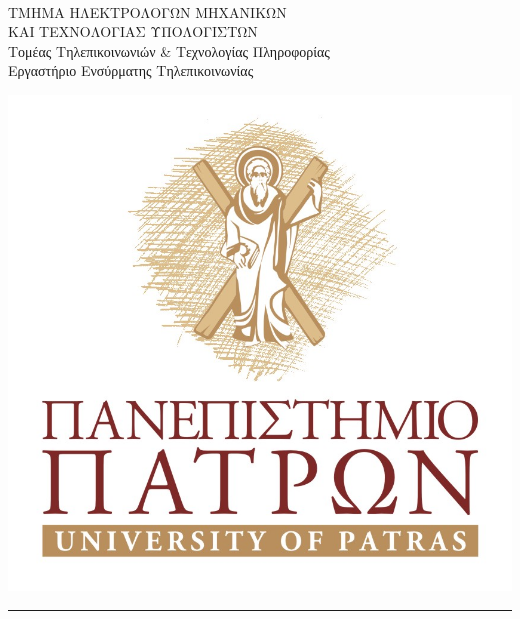 
\pagestyle{empty}



\begin{minipage}[c]{0.69\textwidth}
 \\
ΤΜΗΜΑ ΗΛΕΚΤΡΟΛΟΓΩΝ ΜΗΧΑΝΙΚΩΝ \\
ΚΑΙ ΤΕΧΝΟΛΟΓΙΑΣ ΥΠΟΛΟΓΙΣΤΩΝ \\
Τομέας Τηλεπικοινωνιών \& Τεχνολογίας Πληροφορίας\\
Εργαστήριο Ενσύρματης Τηλεπικοινωνίας
\end{minipage}
\begin{minipage}[c]{0.26\textwidth}
\includegraphics[scale=0.52]{Files/Figures/upatras_logo.jpg}
\end{minipage}



\vskip0.2cm
\noindent\rule{\textwidth}{0.2mm}
\vskip1cm




